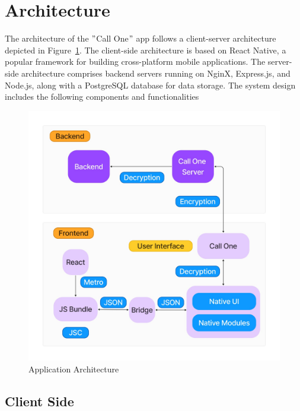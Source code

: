 \section{Architecture}\label{sec:Application Architecture}
The architecture of the \("\)Call One\("\) app follows a client-server architecture depicted in Figure~\ref{fig:Application Architecture}.
The client-side architecture is based on React Native, a popular framework for building cross-platform mobile applications.
The server-side architecture comprises backend servers running on NginX, Express.js, and Node.js, along with a PostgreSQL database for data storage.
The system design includes the following components and functionalities

\begin{figure}
    \centering
    \includegraphics[width=1\linewidth]{Media/arch}
    \caption{Application Architecture}
    \label{fig:Application Architecture}
\end{figure}


\subsection{Client Side}\label{subsec:client-side}

